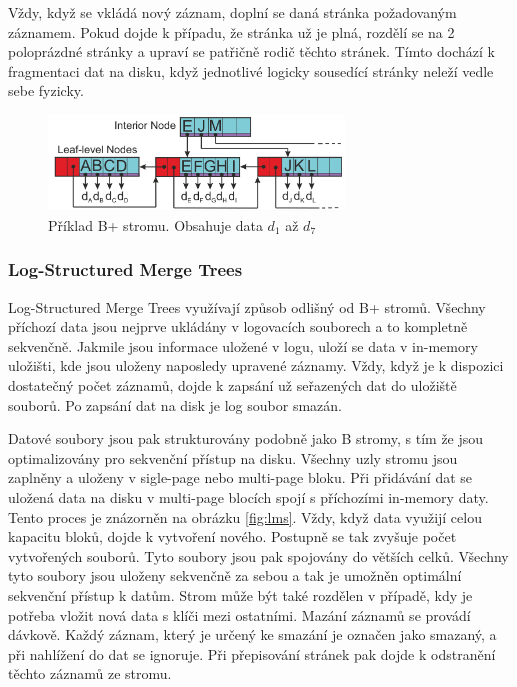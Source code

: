 \documentclass[thesis=M,czech]{FITthesis}[2012/06/26]
\begin{document}
Vždy, když se vkládá nový záznam, doplní se daná stránka požadovaným záznamem. Pokud dojde k případu, že stránka už je plná, rozdělí se na 2 poloprázdné stránky a upraví se patřičně rodič těchto stránek. Tímto dochází k fragmentaci dat na disku, když jednotlivé logicky sousedící stránky neleží vedle sebe fyzicky.
\begin{figure}\centering
	\includegraphics[width=0.7\textwidth, angle=0]{files/Bplustree}
	\caption[Příklad B+ stromu.]{Příklad B+ stromu. Obsahuje data $d_1$ až $d_7$}\label{fig:btree}
\end{figure}


\subsubsection{Log-Structured Merge Trees}
Log-Structured Merge Trees využívají způsob odlišný od B+ stromů. Všechny příchozí data jsou nejprve ukládány v logovacích souborech a to kompletně sekvenčně. Jakmile jsou informace uložené v logu, uloží se data v in-memory uložišti, kde jsou uloženy naposledy upravené záznamy. Vždy, když je k dispozici dostatečný počet záznamů, dojde k zapsání už seřazených dat do uložiště souborů. Po zapsání dat na disk je log soubor smazán. 


Datové soubory jsou pak strukturovány podobně jako B stromy, s tím že jsou optimalizovány pro sekvenční přístup na disku. Všechny uzly stromu jsou zaplněny a uloženy v sigle-page nebo multi-page bloku. Při přidávání dat se uložená data na disku v multi-page blocích spojí s příchozími in-memory daty. Tento proces je znázorněn na obrázku \ref{fig:lms}.  Vždy, když data využijí celou kapacitu bloků, dojde k vytvoření nového.
Postupně se tak zvyšuje počet vytvořených souborů. Tyto soubory jsou pak spojovány do větších celků. Všechny tyto soubory jsou uloženy sekvenčně za sebou a tak je umožněn optimální sekvenční přístup k datům.
Strom může být také rozdělen v případě, kdy je potřeba vložit nová data s klíči mezi ostatními.
Mazání záznamů se provádí dávkově. Každý záznam, který je určený ke smazání je označen jako smazaný, a při nahlížení do dat se ignoruje. Při přepisování stránek pak dojde k odstranění těchto záznamů ze stromu.
\end{document}
